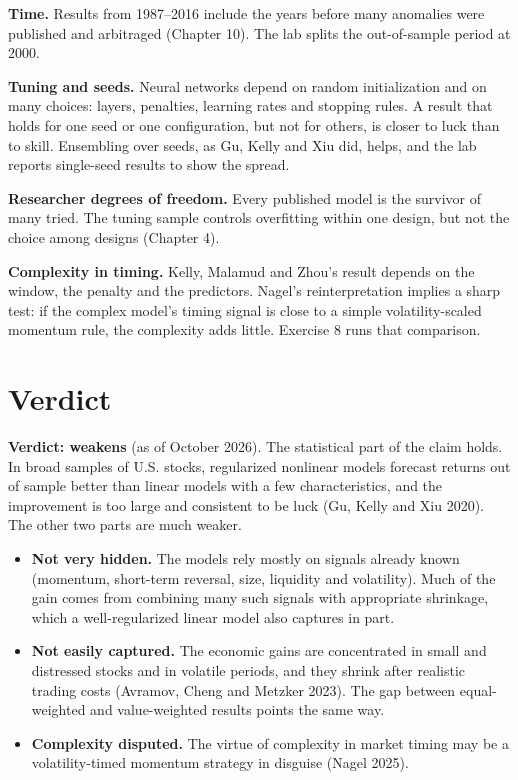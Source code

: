 \textbf{Time.} Results from 1987--2016 include the years before many anomalies were published and arbitraged (Chapter 10). The lab splits the out-of-sample period at 2000.

\textbf{Tuning and seeds.} Neural networks depend on random initialization and on many choices: layers, penalties, learning rates and stopping rules. A result that holds for one seed or one configuration, but not for others, is closer to luck than to skill. Ensembling over seeds, as Gu, Kelly and Xiu did, helps, and the lab reports single-seed results to show the spread.

\textbf{Researcher degrees of freedom.} Every published model is the survivor of many tried. The tuning sample controls overfitting within one design, but not the choice among designs (Chapter 4).

\textbf{Complexity in timing.} Kelly, Malamud and Zhou's result depends on the window, the penalty and the predictors. Nagel's reinterpretation implies a sharp test: if the complex model's timing signal is close to a simple volatility-scaled momentum rule, the complexity adds little. Exercise 8 runs that comparison.

\section{Verdict}
\label{sec:21-verdict}

\begin{callout}
\textbf{Verdict: weakens} (as of October 2026). The statistical part of the claim holds. In broad samples of U.S. stocks, regularized nonlinear models forecast returns out of sample better than linear models with a few characteristics, and the improvement is too large and consistent to be luck (Gu, Kelly and Xiu 2020). The other two parts are much weaker.
\end{callout}

\begin{itemize}
  \item \textbf{Not very hidden.} The models rely mostly on signals already known (momentum, short-term reversal, size, liquidity and volatility). Much of the gain comes from combining many such signals with appropriate shrinkage, which a well-regularized linear model also captures in part.
  \item \textbf{Not easily captured.} The economic gains are concentrated in small and distressed stocks and in volatile periods, and they shrink after realistic trading costs (Avramov, Cheng and Metzker 2023). The gap between equal-weighted and value-weighted results points the same way.
  \item \textbf{Complexity disputed.} The virtue of complexity in market timing may be a volatility-timed momentum strategy in disguise (Nagel 2025).
\end{itemize}

